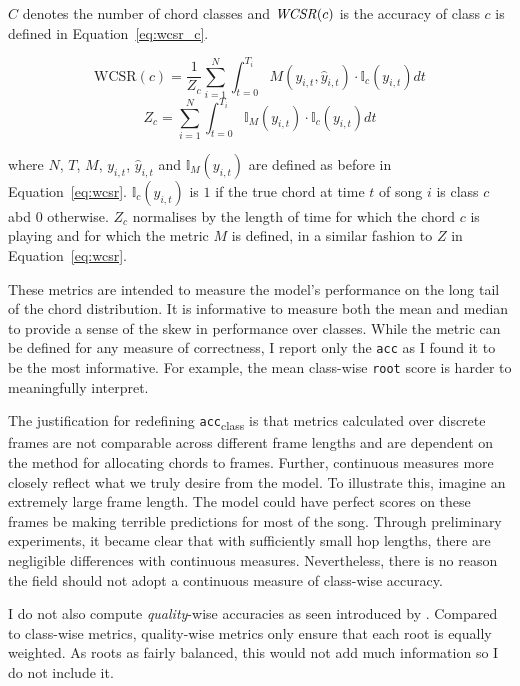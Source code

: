 $C$ denotes the number of chord classes and $\text{\emph{WCSR}}(c)$ is the accuracy of class $c$ is defined in Equation~\ref{eq:wcsr_c}.

\begin{equation}\label{eq:wcsr_c}
    \text{WCSR}(c) = \frac{1}{Z_c}\sum_{i=1}^{N} \int_{t=0}^{T_i} M(y_{i,t},\hat{y}_{i,t}) \cdot \mathbb{I}_c(y_{i,t}) dt
\end{equation}
\begin{equation}
    Z_c = \sum_{i=1}^{N} \int_{t=0}^{T_i} \mathbb{I}_M(y_{i,t})\cdot \mathbb{I}_c(y_{i,t}) dt
\end{equation}

where $N$, $T$, $M$, $y_{i,t}$, $\hat{y}_{i,t}$ and $\mathbb{I}_M(y_{i,t})$ are defined as before in Equation~\ref{eq:wcsr}. $\mathbb{I}_c(y_{i,t})$ is $1$ if the true chord at time $t$ of song $i$ is class $c$ abd $0$ otherwise. $Z_c$ normalises by the length of time for which the chord $c$ is playing and for which the metric $M$ is defined, in a similar fashion to $Z$ in Equation~\ref{eq:wcsr}.

These metrics are intended to measure the model's performance on the long tail of the chord distribution. It is informative to measure both the mean and median to provide a sense of the skew in performance over classes. While the metric can be defined for any measure of correctness, I report only the \texttt{acc} as I found it to be the most informative. For example, the mean class-wise \texttt{root} score is harder to meaningfully interpret.

The justification for redefining \texttt{acc}\textsubscript{class} is that metrics calculated over discrete frames are not comparable across different frame lengths and are dependent on the method for allocating chords to frames. Further, continuous measures more closely reflect what we truly desire from the model. To illustrate this, imagine an extremely large frame length. The model could have perfect scores on these frames be making terrible predictions for most of the song. Through preliminary experiments, it became clear that with sufficiently small hop lengths, there are negligible differences with continuous measures. Nevertheless, there is no reason the field should not adopt a continuous measure of class-wise accuracy.

I do not also compute \emph{quality}-wise accuracies as seen introduced by \citet{CurriculumLearning}. Compared to class-wise metrics, quality-wise metrics only ensure that each root is equally weighted. As roots as fairly balanced, this would not add much information so I do not include it.

